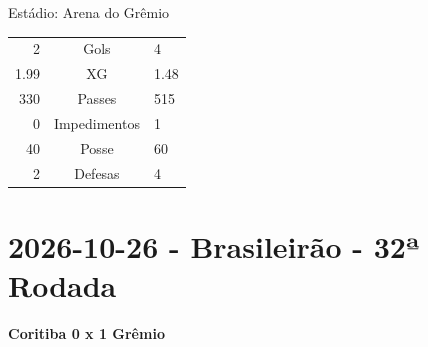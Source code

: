 \documentclass[11pt]{article}
\newcommand{\teamjersey}{}
\begin{document}
\begin{minipage}{0.3\textwidth}
Estádio: Arena do Grêmio\\
\begin{tabular}{rcl}
2 & Gols & 4 \\
1.99 & XG & 1.48 \\
330 & Passes & 515 \\
0 & Impedimentos & 1 \\
40 & Posse & 60 \\
2 & Defesas & 4 \\
\end{tabular}
\end{minipage}
\newpage
\section*{2026-10-26 - Brasileirão - 32ª Rodada}
\textbf{Coritiba 0 x 1 Grêmio}\\
\vspace{0.5cm}
\renewcommand{\teamjersey}{../assets/camisa/costas1.png}
\end{document}

